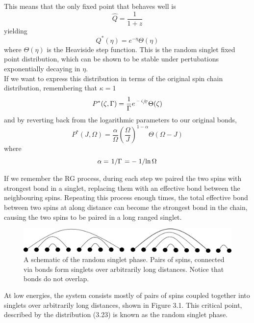\documentclass[../sdrg,../../main.tex]{subfiles}
\begin{document}
This means that the only fixed point that behaves well is
\begin{equation}
    \hat{Q}=\frac{1}{1+z}
\end{equation}
yielding
\begin{equation}
    Q^{*}(\eta)=e^{-\eta}\Theta(\eta)
    \label{eq:rss}
\end{equation}
where $\Theta(\eta)$ is the Heaviside step function. This is the random singlet fixed point distribution, which can be shown to be stable under pertubations exponentially decaying in $\eta$.\cite{fisher}\\

If we want to express this distribution in terms of the original spin chain distribution, remembering that $\kappa = 1 $
\begin{equation}
    P^{*}(\zeta,\Gamma)=\frac{1}{\Gamma}e^{\sfrac{-\zeta}{\Gamma}}\Theta(\zeta)
\end{equation}
and by reverting back from the logarithmic parameters to our original bonds,
\begin{equation}
    P^{*}(J,
    \Omega) =\frac{\alpha}{\Omega}\left(\frac{\Omega}{J}\right)^{1-\alpha}\Theta(\Omega-J)
\end{equation}
where
\begin{equation}
    \alpha = \flatfrac{1}{\Gamma}=-\flatfrac{1}{\ln \Omega}
\end{equation}


If we remember the RG process, during each step we paired the two spins with strongest bond in a singlet, replacing them with an effective bond between the neighbouring spins. Repeating this process enough times, the total effective bond between two spins at along distance can become the strongest bond in the chain, causing the two spins to be paired in a long ranged singlet.\\

\begin{figure}[h!]
    \centering
    \includegraphics[scale = 0.15]{Chapter4/Figures/RSP.png}
    \caption{A schematic of the random singlet phase. Pairs of spins, connected via bonds form singlets over arbitrarily long distances. Notice that bonds do not overlap.}
\end{figure}

At low energies, the system consists mostly of pairs of spins coupled together into singlets over arbitrarily long distances, shown in Figure 3.1. This critical point, described by the distribution (3.23) is known as the random singlet phase.
\end{document}
